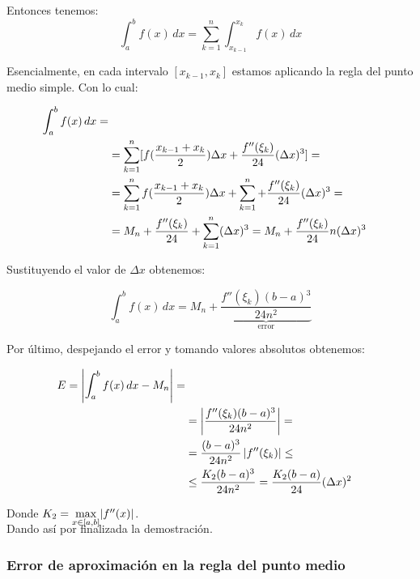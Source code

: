 \documentclass{article}
\begin{document}
			Entonces tenemos: 
			\begin{equation}
				\int_{a}^{b} f(x) \,dx=\sum_{k = 1}^{n}\int_{x_{k-1}}^{x_k} f(x) \,dx    
			\end{equation}
			
			Esencialmente, en cada intervalo $[x_{k-1},x_k]$ estamos aplicando la regla del punto medio simple. Con lo cual:
			
			\begin{align}
				\int_{a}^{b} f(x) \,dx= \notag \\
				&=\sum_{k = 1}^{n}[f(\frac{x_{k-1}+x_k}{2})\Delta x+\frac{f''(\xi_k)}{24}(\Delta x){^3}]= \notag \\
				&=\sum_{k = 1}^{n}f(\frac{x_{k-1}+x_k}{2})\Delta x + \sum_{k = 1}^{n}+\frac{f''(\xi_k)}{24}(\Delta x){^3}= \notag \\
				&=M_n+\frac{f''(\xi_k)}{24}+\sum_{k = 1}^{n}(\Delta x){^3}=M_n+\frac{f''(\xi_k)}{24}n(\Delta x){^3}
			\end{align}
			
			Sustituyendo el valor de $\Delta x$ obtenemos:
			
			\begin{equation}
				\int_{a}^{b} f(x) \,dx=M_n+\underbrace{\frac{f''(\xi_k)(b-a){^3}}{24n^2}}_{\text{error}}
			\end{equation}
			
			Por último, despejando el error y tomando valores absolutos obtenemos:
			
			\begin{align}
				E=\left\lvert \int_{a}^{b} f(x) \,dx-M_n \right\rvert= \notag \\
				&=\left\lvert \frac{f''(\xi_k)(b-a){^3}}{24n^2} \right\rvert= \notag \\
				&=\frac{(b-a){^3}}{24n^2}\left\lvert f''(\xi_k) \right\rvert\leq \notag \\
				&\leq \frac{K_2(b-a){^3}}{24n^2}=\frac{K_2(b-a)}{24}(\Delta x){^2}
			\end{align}
			
			Donde $K_2=\smash{\displaystyle\max_{x \in [a,b]}} |f''(x)|$. \\

			Dando así por finalizada la demostración. 
			
			\subsubsection{Error de aproximación en la regla del punto medio}
			
\end{document}
